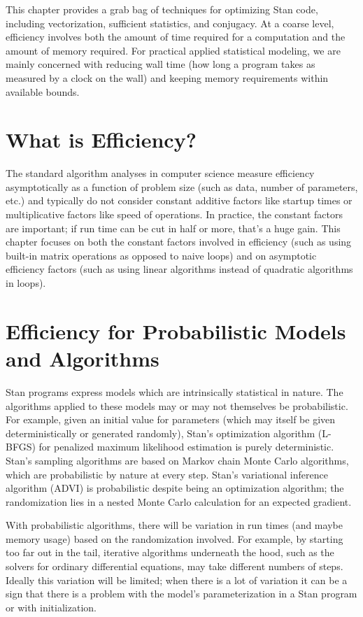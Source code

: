 \noindent
This chapter provides a grab bag of techniques for optimizing Stan
code, including vectorization, sufficient statistics, and conjugacy.
At a coarse level, efficiency involves both the amount of time
required for a computation and the amount of memory required.  For
practical applied statistical modeling, we are mainly concerned with
reducing wall time (how long a program takes as measured by a clock on
the wall) and keeping memory requirements within available bounds.

\section{What is Efficiency?}

The standard algorithm analyses in computer science measure efficiency
asymptotically as a function of problem size (such as data, number of
parameters, etc.) and typically do not consider constant additive
factors like startup times or multiplicative factors like speed of
operations.  In practice, the constant factors are important; if run
time can be cut in half or more, that's a huge gain. This chapter
focuses on both the constant factors involved in efficiency (such as
using built-in matrix operations as opposed to naive loops) and on
asymptotic efficiency factors (such as using linear algorithms instead
of quadratic algorithms in loops).


\section{Efficiency for Probabilistic Models and Algorithms}

Stan programs express models which are intrinsically statistical in
nature.  The algorithms applied to these models may or may not
themselves be probabilistic.  For example, given an initial value for
parameters (which may itself be given deterministically or generated
randomly), Stan's optimization algorithm (L-BFGS) for penalized
maximum likelihood estimation is purely deterministic.  Stan's
sampling algorithms are based on Markov chain Monte Carlo algorithms,
which are probabilistic by nature at every step.  Stan's variational
inference algorithm (ADVI) is probabilistic despite being an
optimization algorithm; the randomization lies in a nested Monte Carlo
calculation for an expected gradient.

With probabilistic algorithms, there will be variation in run times
(and maybe memory usage) based on the randomization involved.  For
example, by starting too far out in the tail, iterative algorithms
underneath the hood, such as the solvers for ordinary differential
equations, may take different numbers of steps.  Ideally this
variation will be limited;  when there is a lot of variation it can be
a sign that there is a problem with the model's parameterization in
a Stan program or with initialization.

